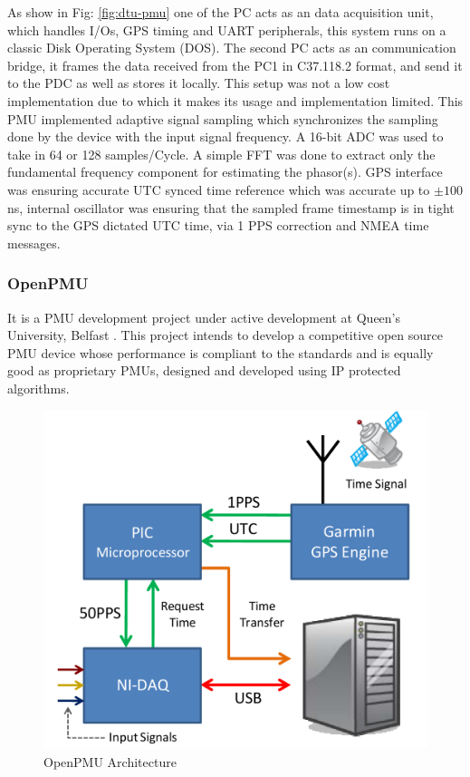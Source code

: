  As show in Fig: \ref{fig:dtu-pmu} one of the PC acts as an data acquisition unit, which handles I/Os, GPS timing and UART peripherals, this system runs on a classic Disk Operating System (DOS). The second PC acts as an communication bridge, it frames the data received from the PC1 in C37.118.2 format, and send it to the PDC as well as stores it locally. This setup was not a low cost implementation due to which it makes its usage and implementation limited. This PMU implemented adaptive signal sampling which synchronizes the sampling done by the device with the input signal frequency. A 16-bit ADC was used to take in 64 or 128 samples/Cycle.  A simple FFT was done to extract only the fundamental frequency component for estimating the phasor(s). GPS interface was ensuring accurate UTC synced time reference which was accurate up to   $ \pm 100$ ns, internal oscillator was ensuring that the sampled frame timestamp is in tight sync to the GPS dictated UTC time, via 1 PPS correction and NMEA time messages. 
 
 \subsubsection{OpenPMU}
 It is a PMU development project under active development at Queen's University, Belfast \cite{paper:openpmu} . This project intends to develop a competitive open source PMU device whose performance is compliant to the standards and is equally good as proprietary PMUs, designed and developed using IP protected algorithms. 
 
 \begin{figure}[h]
 	\includegraphics[scale=0.5]{fig/OpenPMU.png}
 	\caption{OpenPMU Architecture}
 	\label{fig:OpenPMU}
 \end{figure}    
 
